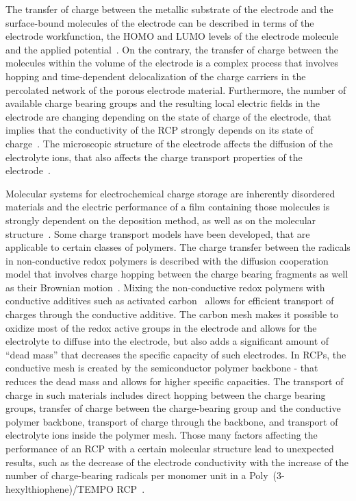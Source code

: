 \par
The transfer of charge between the metallic substrate of the electrode and the surface-bound molecules of the electrode can be described in terms of the electrode workfunction, the HOMO and LUMO levels of the electrode molecule and the applied potential~\cite{Bard_book}. 
On the contrary, the transfer of charge between the molecules within the volume of the electrode is a complex process that involves hopping and time-dependent delocalization of the charge carriers in the percolated network of the porous electrode material. Furthermore, the number of available charge bearing groups and the resulting local electric fields in the electrode are changing depending on the state of charge of the electrode, that implies that the conductivity of the RCP strongly depends on its state of charge~\cite{Zhang2018}.
The microscopic structure of the electrode affects the diffusion of the electrolyte ions, that also affects the charge transport properties of the electrode~\cite{Koshika_2009,He_2022}.\\ 

\par
Molecular systems for electrochemical charge storage are inherently disordered materials and the electric performance of a film containing those molecules is strongly dependent on the deposition method, as well as on the molecular structure~\cite{Xie2021,Zhang2018}. Some charge transport models have been developed, that are applicable to certain classes of polymers. The charge transfer between the radicals in non-conductive redox polymers is described with the diffusion cooperation model that involves charge hopping between the charge bearing fragments as well as their Brownian motion~\cite{Sato2018}. Mixing the non-conductive redox polymers with conductive additives such as activated carbon~\cite{Vereshchagin2022,Daniel2023_Multimodal} allows for efficient transport of charges through the conductive additive. The carbon mesh makes it possible to oxidize most of the redox active groups in the electrode and allows for the electrolyte to diffuse into the electrode, but also adds a significant amount of ``dead mass'' that decreases the specific capacity of such electrodes. In RCPs, the conductive  mesh is created by the semiconductor polymer backbone - that reduces the dead mass and allows for higher specific capacities. The transport of charge in such materials includes direct hopping between the charge bearing groups, transfer of charge between the charge-bearing group and the conductive polymer backbone, transport of charge through the backbone, and transport of electrolyte ions inside the polymer mesh. Those many factors affecting the performance of an RCP with a certain molecular structure lead to unexpected results, such as the decrease of the electrode conductivity with the increase of the number of charge-bearing radicals per monomer unit in a Poly~(3-hexylthiophene)/TEMPO RCP~\cite{Zhang2018}.



